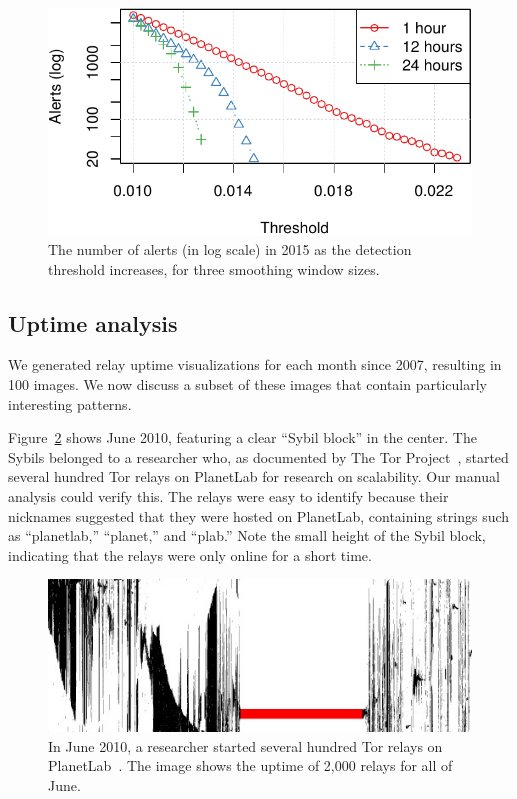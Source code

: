 \begin{figure}[t]
	\centering
	\includegraphics[width=0.9\linewidth]{diagrams/threshold-alarm.pdf}
	\caption{The number of alerts (in log scale) in 2015 as the detection
	threshold increases, for three smoothing window sizes.}
	\label{fig:threshold-alarm}
\end{figure}

\subsection{Uptime analysis}
\label{sec:uptime}
We generated relay uptime visualizations for each month since 2007, resulting in
100 images.  We now discuss a subset of these images that contain particularly
interesting patterns.

Figure~\ref{fig:2010-06-planetlab} shows June 2010, featuring a clear ``Sybil
block'' in the center.  The Sybils belonged to a researcher who, as documented
by The Tor Project~\cite{progressreport}, started several hundred Tor relays on
PlanetLab for research on scalability.  Our manual analysis could verify this.
The relays were easy to identify because their nicknames suggested that they
were hosted on PlanetLab, containing strings such as ``planetlab,'' ``planet,''
and ``plab.''  Note the small height of the Sybil block, indicating that the
relays were only online for a short time.

\begin{figure}[t]
	\centering
	\includegraphics[width=\linewidth]{diagrams/2010-06.jpg}
	\caption{In June 2010, a researcher started several hundred Tor relays on
		PlanetLab~\cite{progressreport}.  The image shows the uptime of 2,000
		relays for all of June.}
	\label{fig:2010-06-planetlab}
\end{figure}

